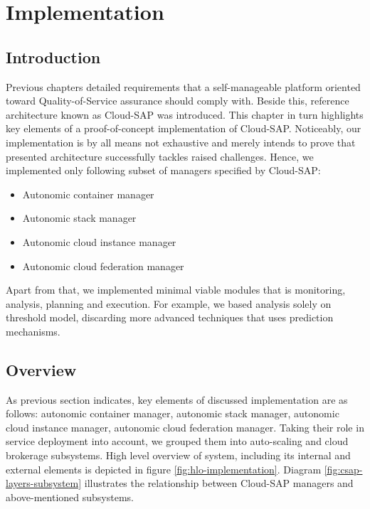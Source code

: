 \chapter{Implementation}


\section{Introduction}
Previous chapters detailed requirements that a self-manageable platform oriented toward Quality-of-Service assurance should comply with. Beside this, reference architecture known as Cloud-SAP was introduced. This chapter in turn highlights key elements of a proof-of-concept implementation of Cloud-SAP. Noticeably, our implementation is by all means not exhaustive and merely intends to prove that presented architecture successfully tackles raised challenges. Hence, we implemented only following subset of managers specified by Cloud-SAP:
\begin{itemize}
  \item Autonomic container manager
  \item Autonomic stack manager
  \item Autonomic cloud instance manager
  \item Autonomic cloud federation manager
\end{itemize}

Apart from that, we implemented minimal viable modules that is monitoring, analysis, planning and execution. For example, we based analysis solely on threshold model, discarding more advanced techniques that uses prediction mechanisms.

\section{Overview}
As previous section indicates, key elements of discussed implementation are as follows: autonomic container manager, autonomic stack manager, autonomic cloud instance manager, autonomic cloud federation manager. Taking their role in service deployment into account, we grouped them into auto-scaling and cloud brokerage subsystems. High level overview of system, including its internal and external elements is depicted in figure \ref{fig:hlo-implementation}. Diagram \ref{fig:csap-layers-subsystem} illustrates the relationship between Cloud-SAP managers and above-mentioned subsystems. 

